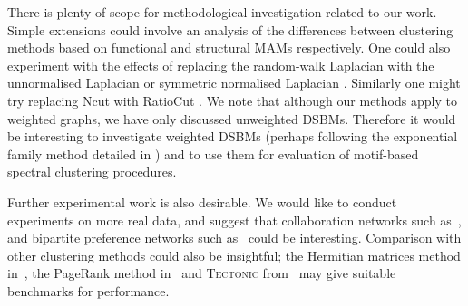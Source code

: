There is plenty of scope for methodological investigation related to our work.
Simple extensions could involve an analysis of the differences between clustering methods based on functional and structural MAMs respectively.
One could also experiment with the effects of replacing the random-walk Laplacian with the unnormalised Laplacian or symmetric normalised Laplacian \cite{von2007tutorial}.
Similarly one might try replacing Ncut with RatioCut \cite{hagen1992new}. We note that although our methods apply to weighted graphs, we have only discussed unweighted DSBMs. Therefore it would be interesting to investigate weighted DSBMs (perhaps following the exponential family method detailed in \cite{aicher2013adapting}) and to use them for evaluation of motif-based spectral clustering procedures.

Further experimental work is also desirable. We would like to conduct experiments on more real data, and suggest that collaboration networks such as~\cite{snap:astro}, and bipartite preference networks such as~\cite{icon:movie} could be interesting.
Comparison with other clustering methods could also be insightful; the Hermitian matrices method in~\cite{DirectedClustImbCuts}, the PageRank method in~\cite{yin2017local} and \textsc{Tectonic} from~\cite{tsourakakis2017scalable} may give suitable benchmarks for performance.



